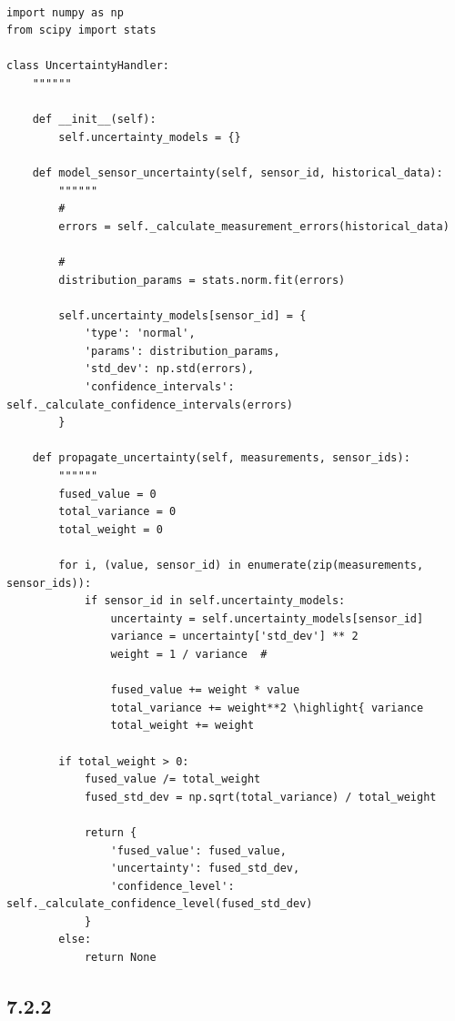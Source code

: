 \hypertarget{section-95}{%
\paragraph{}\label{section-95}}

\begin{lstlisting}[style=python]
import numpy as np
from scipy import stats

class UncertaintyHandler:
    """"""
    
    def __init__(self):
        self.uncertainty_models = {}
    
    def model_sensor_uncertainty(self, sensor_id, historical_data):
        """"""
        # 
        errors = self._calculate_measurement_errors(historical_data)
        
        # 
        distribution_params = stats.norm.fit(errors)
        
        self.uncertainty_models[sensor_id] = {
            'type': 'normal',
            'params': distribution_params,
            'std_dev': np.std(errors),
            'confidence_intervals': self._calculate_confidence_intervals(errors)
        }
    
    def propagate_uncertainty(self, measurements, sensor_ids):
        """"""
        fused_value = 0
        total_variance = 0
        total_weight = 0
        
        for i, (value, sensor_id) in enumerate(zip(measurements, sensor_ids)):
            if sensor_id in self.uncertainty_models:
                uncertainty = self.uncertainty_models[sensor_id]
                variance = uncertainty['std_dev'] ** 2
                weight = 1 / variance  # 
                
                fused_value += weight * value
                total_variance += weight**2 \highlight{ variance
                total_weight += weight
        
        if total_weight > 0:
            fused_value /= total_weight
            fused_std_dev = np.sqrt(total_variance) / total_weight
            
            return {
                'fused_value': fused_value,
                'uncertainty': fused_std_dev,
                'confidence_level': self._calculate_confidence_level(fused_std_dev)
            }
        else:
            return None
\end{lstlisting}

\hypertarget{section-96}{%
\subsection{7.2.2}\label{section-96}}


